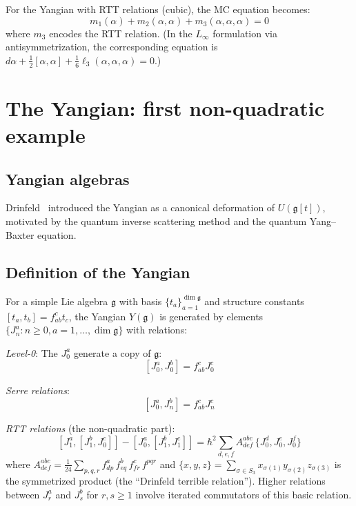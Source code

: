 \begin{example}
For the Yangian with RTT relations (cubic), the MC equation becomes:
\[
m_1(\alpha) + m_2(\alpha, \alpha) + m_3(\alpha, \alpha, \alpha) = 0
\]
where $m_3$ encodes the RTT relation. (In the $L_\infty$ formulation via
antisymmetrization, the corresponding equation is
$d\alpha + \frac{1}{2}[\alpha,\alpha] + \frac{1}{6}\ell_3(\alpha,\alpha,\alpha) = 0$.)
\end{example}


\section{The Yangian: first non-quadratic example}

\subsection{Yangian algebras}

Drinfeld~\cite{Drinfeld85} introduced the Yangian as a canonical deformation of $U(\mathfrak{g}[t])$, motivated by the quantum inverse scattering method and the quantum Yang--Baxter equation.

\subsection{Definition of the Yangian}

\begin{definition}\label{def:yangian-kps}
For a simple Lie algebra $\mathfrak{g}$ with basis $\{t_a\}_{a=1}^{\dim \mathfrak{g}}$ and structure constants $[t_a, t_b] = f_{ab}^c t_c$, the Yangian $Y(\mathfrak{g})$ is generated by elements $\{J_n^a : n \geq 0, a = 1, \ldots, \dim \mathfrak{g}\}$ with relations:

\emph{Level-0}: The $J_0^a$ generate a copy of $\mathfrak{g}$:
\[
[J_0^a, J_0^b] = f_{ab}^c J_0^c
\]

\emph{Serre relations}:
\[
[J_0^a, J_n^b] = f_{ab}^c J_n^c
\]

\emph{RTT relations} (the non-quadratic part):
\[
[J_1^a, [J_1^b, J_0^c]] - [J_0^a, [J_1^b, J_1^c]] = \hbar^2 \sum_{d,e,f} A^{abc}_{def}\, \{J_0^d, J_0^e, J_0^f\}
\]
where $A^{abc}_{def} = \tfrac{1}{24}\sum_{p,q,r} f^a_{dp}\, f^b_{eq}\, f^c_{fr}\, f^{pqr}$ and
$\{x,y,z\} = \sum_{\sigma \in S_3} x_{\sigma(1)} y_{\sigma(2)} z_{\sigma(3)}$ is the
symmetrized product (the ``Drinfeld terrible relation''). Higher relations between
$J_r^a$ and $J_s^b$ for $r,s \geq 1$ involve iterated commutators of this basic relation.
\end{definition}

